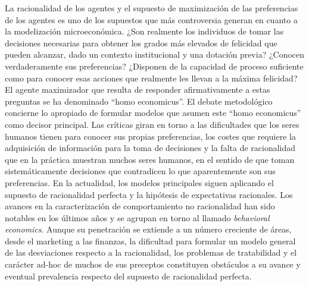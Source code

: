 \documentclass{nuevotema}
\begin{document}
La racionalidad de los agentes y el supuesto de maximización de las preferencias de los agentes es uno de los supuestos que más controversia generan en cuanto a la modelización microeconómica. ¿Son realmente los individuos de tomar las decisiones necesarias para obtener los grados más elevados de felicidad que pueden alcanzar, dado un contexto institucional y una dotación previa? ¿Conocen verdaderamente sus preferencias? ¿Disponen de la capacidad de proceso suficiente como para conocer esas acciones que realmente les llevan a la máxima felicidad? El agente maximizador que resulta de responder afirmativamente a estas preguntas se ha denominado ``homo economicus''. El debate metodológico concierne lo apropiado de formular modelos que asumen este ``homo economicus'' como decisor principal. Las críticas giran en torno a las dificultades que los seres humanos tienen para conocer sus propias preferencias, los costes que requiere la adquisición de información para la toma de decisiones y la falta de racionalidad que en la práctica muestran muchos seres humanos, en el sentido de que toman sistemáticamente decisiones que contradicen lo que aparentemente son sus preferencias. En la actualidad, los modelos principales siguen aplicando el supuesto de racionalidad perfecta y la hipótesis de expectativas racionales. Los avances en la caracterización de comportamiento no racionalidad han sido notables en los últimos años y se agrupan en torno al llamado \textit{behavioral economics}. Aunque su penetración se extiende a un número creciente de áreas, desde el marketing a las finanzas, la dificultad para formular un modelo general de las desviaciones respecto a la racionalidad, los problemas de tratabilidad y el carácter ad-hoc de muchos de sus preceptos constituyen obstáculos a su avance y eventual prevalencia respecto del supuesto de racionalidad perfecta.
\end{document}
